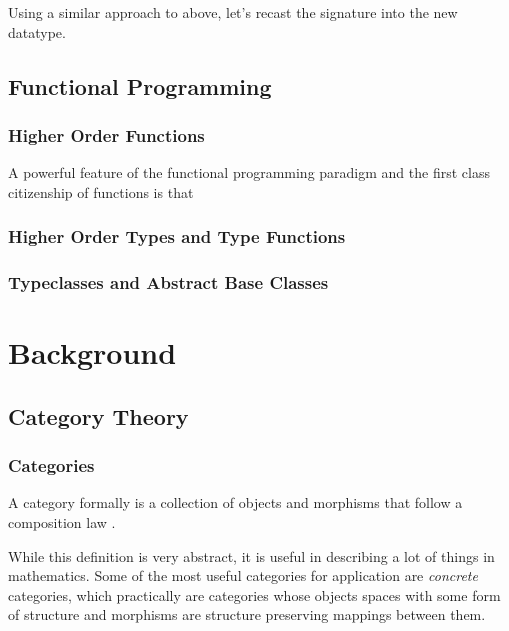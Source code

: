 
Using a similar approach to above, let's recast the signature into the new datatype.


\section{Functional Programming}
\subsection{Higher Order Functions}

A powerful feature of the functional programming paradigm and the first class citizenship of functions is that 

\subsection{Higher Order Types and Type Functions}
\subsection{Typeclasses and Abstract Base Classes}

\chapter{Background}
\section{Category Theory}
\subsection{Categories}

A category formally is a collection of objects and morphisms that follow a composition law \cite{context}. 

While this definition is very abstract, it is useful in describing a lot of things  in mathematics.
Some of the most useful categories for application are \emph{concrete} categories, which practically are categories whose objects spaces with some form of structure and morphisms are structure preserving mappings between them.


